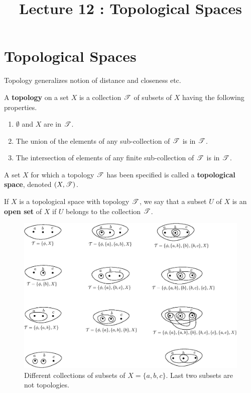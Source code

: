 \documentclass[a4paper,english,12pt]{article}   	%
\title{Lecture 12 : Topological Spaces}
\author{}
\begin{document}
\maketitle
\section{Topological Spaces}
Topology generalizes notion of distance and closeness etc. 
\begin{defn} A \textbf{topology} on a set $X$ is a collection $\mathscr{T}$ of subsets of $X$ having the following properties.
\begin{enumerate}
\item $\emptyset$ and $X$ are in $\mathscr{T}$.
\item The union of the elements of any sub-collection of $\mathscr{T}$ is in $\mathscr{T}$.
\item The intersection of elements of any finite sub-collection of $\mathscr{T}$ is in $\mathscr{T}$. 
\end{enumerate}
A set $X$ for which a topology $\mathscr{T}$ has been specified is called a \textbf{topological space}, denoted $(X,\mathscr{T})$.
\end{defn}

\begin{defn} If $X$ is a topological space with topology $\mathscr{T}$, we say that a subset $U$ of $X$ is an \textbf{open set} of $X$ if $U$ belongs to the collection $\mathscr{T}$.
\end{defn}

\begin{figure}[hhhh]
 \centering
 \includegraphics[width=\textwidth]{fig133.eps}
	\caption{Different collections of subsets of $X = \{a,b,c\}$. Last two subsets are not topologies.}
	\label{Fig:ExampleTopologies}
\end{figure}
\end{document}
